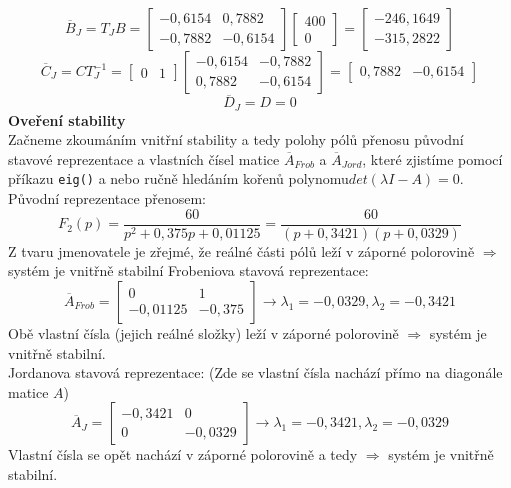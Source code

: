 \documentclass{article}
\begin{document}
				\[\overline{B}_{J} = T_{J}B = \begin{bmatrix}
					-0,6154&0,7882\\
					-0,7882&-0,6154
				\end{bmatrix}\begin{bmatrix}
					400\\0
				\end{bmatrix}=\begin{bmatrix}
					-246,1649\\-315,2822
				\end{bmatrix}\]
				\[\overline{C}_{J}=CT_{J}^{-1}=\begin{bmatrix}
					0&1
				\end{bmatrix}\begin{bmatrix}
					-0,6154&-0,7882\\
					0,7882&-0,6154
				\end{bmatrix}=\begin{bmatrix}
					0,7882&-0,6154
				\end{bmatrix}\]
				\[\overline{D}_{J}=D=0\]
			\textbf{Oveření stability}\\
			Začneme zkoumáním vnitřní stability a tedy polohy pólů přenosu původní stavové reprezentace a vlastních čísel matice \(\overline{A}_{Frob}\) a \(\overline{A}_{Jord}\), které zjistíme pomocí příkazu \verb*|eig()| a nebo ručně hledáním kořenů polynomu\(det(\lambda I-A)=0\).\\
			Původní reprezentace přenosem:
			\[F_{2}(p)=\frac{60}{p^2 + 0,375 p + 0,01125}=\frac{60}{(p+0,3421)(p+0,0329)}\]
			Z tvaru jmenovatele je zřejmé, že reálné části pólů leží v záporné polorovině $\Rightarrow$systém je vnitřně stabilní
			Frobeniova stavová reprezentace:
			\[\overline{A}_{Frob}=\begin{bmatrix}
				0&1\\
				-0,01125&-0,375
			\end{bmatrix}\rightarrow \lambda_{1}=-0,0329,\lambda_{2}=-0,3421\]
			Obě vlastní čísla (jejich reálné složky) leží v záporné polorovině $\Rightarrow$ systém je vnitřně stabilní.\\
			Jordanova stavová reprezentace:
			(Zde se vlastní čísla nachází přímo na diagonále matice \(A\))
			\[\overline{A}_{J}=\begin{bmatrix}
				-0,3421&0\\
				0&-0,0329
			\end{bmatrix}\rightarrow \lambda_{1}=-0,3421,\lambda_{2}=-0,0329\]
			Vlastní čísla se opět nachází v záporné polorovině a tedy $\Rightarrow$ systém je vnitřně stabilní.\\
\end{document}

